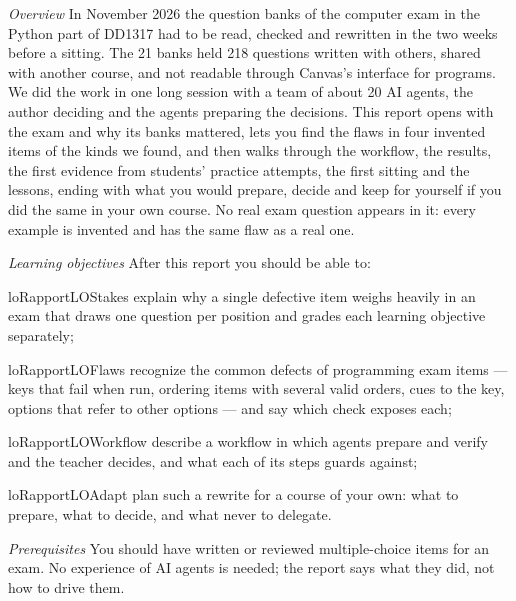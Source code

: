 
\emph{Overview}
In November 2026 the question banks of the computer exam in the Python
part of DD1317 had to be read, checked and rewritten in the two weeks
before a sitting.  The 21 banks held 218 questions written with others,
shared with another course, and not readable through Canvas's interface
for programs.  We did the work in one long session with a team of about
20 AI agents, the author deciding and the agents preparing the decisions.
This report opens with the exam and why its banks mattered, lets you find
the flaws in four invented items of the kinds we found, and then walks
through the workflow, the results, the first evidence from students'
practice attempts, the first sitting and the lessons, ending with what
you
would prepare, decide and keep for yourself if you did the same in your
own course.  No real exam question appears in it: every example is
invented and has the same flaw as a real one.

\emph{Learning objectives}
After this report you should be able to:
\begin{restatable}{lo}{RapportLOStakes}\label{RapportLOStakes}%
  explain why a single defective item weighs heavily in an exam that
  draws one question per position and grades each learning objective
  separately;
\end{restatable}
\begin{restatable}{lo}{RapportLOFlaws}\label{RapportLOFlaws}%
  recognize the common defects of programming exam items --- keys that
  fail when run, ordering items with several valid orders, cues to the
  key, options that refer to other options --- and say which check
  exposes each;
\end{restatable}
\begin{restatable}{lo}{RapportLOWorkflow}\label{RapportLOWorkflow}%
  describe a workflow in which agents prepare and verify and the teacher
  decides, and what each of its steps guards against;
\end{restatable}
\begin{restatable}{lo}{RapportLOAdapt}\label{RapportLOAdapt}%
  plan such a rewrite for a course of your own: what to prepare, what to
  decide, and what never to delegate.
\end{restatable}

\emph{Prerequisites}
You should have written or reviewed multiple-choice items for an exam.
No experience of AI agents is needed; the report says what they did, not
how to drive them.

